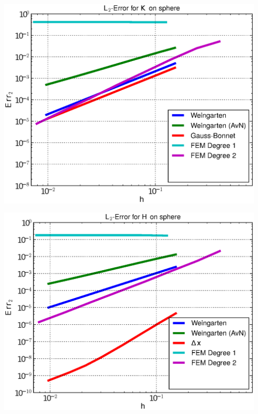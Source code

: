 \documentclass[handout]{beamer}
\begin{document}
\begin{frame}
\begin{overprint}
\begin{minipage}[t]{0.49\textwidth}
            \centering\includegraphics[width=\textwidth]{bilder/Curvature/sphere/ErrKL2_5.eps}
          \end{minipage}\hfill
          \begin{minipage}[t]{0.49\textwidth}
            \centering\includegraphics[width=\textwidth]{bilder/Curvature/sphere/ErrHL2_5.eps}
          \end{minipage}
          \begin{minipage}[t]{0.49\textwidth}

\end{minipage}
\end{overprint}
\end{frame}
\end{document}
